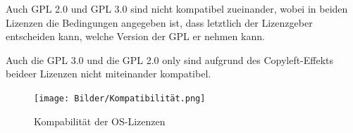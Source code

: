 Auch GPL 2.0 und GPL 3.0 sind nicht kompatibel zueinander, wobei in beiden Lizenzen die Bedingungen angegeben ist, dass letztlich der Lizenzgeber entscheiden kann, welche Version der GPL er nehmen kann.

Auch die GPL 3.0 und die GPL 2.0 only sind aufgrund des Copyleft-Effekts beideer Lizenzen nicht miteinander kompatibel. 

\begin{figure}[h]
    \centering
    \texttt{[image: Bilder/Kompatibilität.png]}
    \caption{Kompabilität der OS-Lizenzen}
\end{figure}













